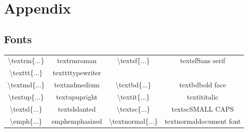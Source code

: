 \documentclass[11pt]{article}
\begin{document}


\section{Appendix}
\subsection{Fonts}
\begin{table}[!ht]
	\begin{center}
		\begin{tabular}{cccc}
			\hline
			\textbackslash textrm\{...\}&textrm{roman}&\textbackslash textsf\{...\}&textsf{Sans serif}\\
			
			\textbackslash texttt\{...\}&texttt{typewriter}&&\\
			
			\textbackslash textmd\{...\}&textmd{medium}&\textbackslash textbd\{...\}&textbd{bold face}\\
			
			\textbackslash textup\{...\}&textup{upright}&\textbackslash textit\{...\}&textit{italic}\\
			
			\textbackslash textsl\{...\}&textsl{slanted}&\textbackslash textsc\{...\}&textsc{SMALL CAPS}\\
			
			\textbackslash emph\{...\}&emph{emphasized}&\textbackslash textnormal\{...\}&textnormal{document font}\\
			
			
			\hline
		\end{tabular}
		\label{Fonts}
	\end{center}
\end{table}
\end{document}
